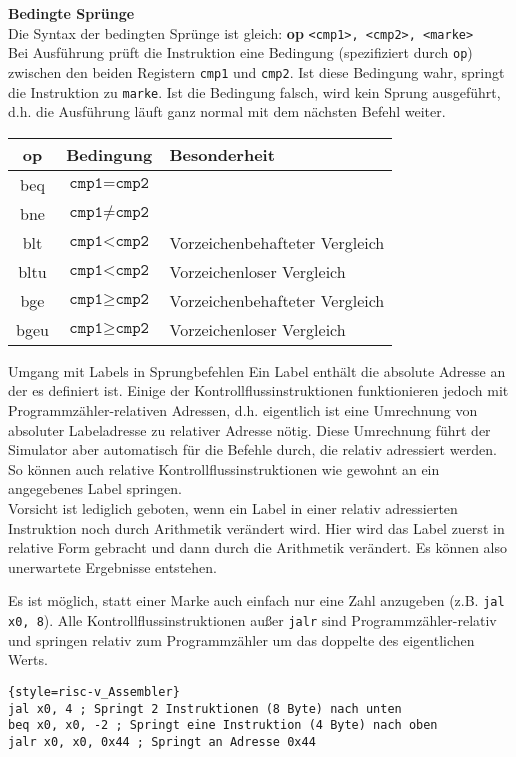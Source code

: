 \textbf{Bedingte Sprünge}\\

Die Syntax der bedingten Sprünge ist gleich: \textbf{op} \texttt{<cmp1>, <cmp2>, <marke>}\\
Bei Ausführung prüft die Instruktion eine Bedingung (spezifiziert durch \texttt{op}) zwischen den beiden Registern \texttt{cmp1} und \texttt{cmp2}. Ist diese Bedingung wahr, springt die Instruktion zu \texttt{marke}. Ist die Bedingung falsch, wird kein Sprung ausgeführt, d.h. die Ausführung läuft ganz normal mit dem nächsten Befehl weiter.\\
\begin{tabular}{|c|c|l|}
	\hline
	op & Bedingung & Besonderheit\\
	\hline
	beq & $\texttt{cmp1} = \texttt{cmp2}$ & \\
	\hline
	bne & $\texttt{cmp1} \ne \texttt{cmp2}$ & \\
	\hline
	blt & $\texttt{cmp1} < \texttt{cmp2}$ & Vorzeichenbehafteter Vergleich\\
	\hline
	bltu & $\texttt{cmp1} < \texttt{cmp2}$ & Vorzeichenloser Vergleich\\
	\hline
	bge & $\texttt{cmp1} \ge \texttt{cmp2}$ & Vorzeichenbehafteter Vergleich\\
	\hline
	bgeu & $\texttt{cmp1} \ge \texttt{cmp2}$ & Vorzeichenloser Vergleich\\
	\hline
\end{tabular}

\begin{infoblock}{Umgang mit Labels in Sprungbefehlen}
	Ein Label enthält die absolute Adresse an der es definiert ist. Einige der Kontrollflussinstruktionen funktionieren jedoch mit Programmzähler-relativen Adressen, d.h. eigentlich ist eine Umrechnung von absoluter Labeladresse zu relativer Adresse nötig. Diese Umrechnung führt der Simulator aber automatisch für die Befehle durch, die relativ adressiert werden. So können auch relative Kontrollflussinstruktionen wie gewohnt an ein angegebenes Label springen.\\
	Vorsicht ist lediglich geboten, wenn ein Label in einer relativ adressierten Instruktion noch durch Arithmetik verändert wird. Hier wird das Label zuerst in relative Form gebracht und dann durch die Arithmetik verändert. Es können also unerwartete Ergebnisse entstehen.
\end{infoblock}

\begin{warningblock}
	Es ist möglich, statt einer Marke auch einfach nur eine Zahl anzugeben (z.B. \texttt{jal x0, 8}).
	Alle Kontrollflussinstruktionen außer \texttt{jalr} sind Programmzähler-relativ und springen relativ zum Programmzähler um das doppelte des eigentlichen Werts.\\
\begin{lstlisting}{style=risc-v_Assembler}
jal x0, 4 ; Springt 2 Instruktionen (8 Byte) nach unten
beq x0, x0, -2 ; Springt eine Instruktion (4 Byte) nach oben
jalr x0, x0, 0x44 ; Springt an Adresse 0x44
\end{lstlisting}
\end{warningblock}


